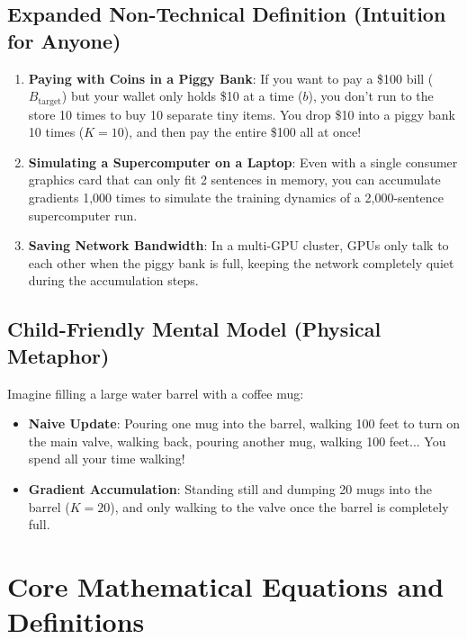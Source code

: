 \documentclass[11pt,a4paper]{article}
\theoremstyle{definition}
\begin{document}
\subsection{Expanded Non-Technical Definition (Intuition for Anyone)}
\begin{enumerate}
    \item \textbf{Paying with Coins in a Piggy Bank}: If you want to pay a \$100 bill ($B_{\text{target}}$) but your wallet only holds \$10 at a time ($b$), you don't run to the store 10 times to buy 10 separate tiny items. You drop \$10 into a piggy bank 10 times ($K=10$), and then pay the entire \$100 all at once!
    \item \textbf{Simulating a Supercomputer on a Laptop}: Even with a single consumer graphics card that can only fit 2 sentences in memory, you can accumulate gradients 1,000 times to simulate the training dynamics of a 2,000-sentence supercomputer run.
    \item \textbf{Saving Network Bandwidth}: In a multi-GPU cluster, GPUs only talk to each other when the piggy bank is full, keeping the network completely quiet during the accumulation steps.
\end{enumerate}

\subsection{Child-Friendly Mental Model (Physical Metaphor)}
Imagine filling a large water barrel with a coffee mug:
\begin{itemize}
    \item \textbf{Naive Update}: Pouring one mug into the barrel, walking 100 feet to turn on the main valve, walking back, pouring another mug, walking 100 feet... You spend all your time walking!
    \item \textbf{Gradient Accumulation}: Standing still and dumping 20 mugs into the barrel ($K=20$), and only walking to the valve once the barrel is completely full.
\end{itemize}

\section{Core Mathematical Equations and Definitions}
\end{document}
